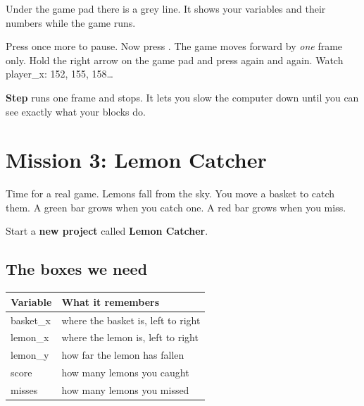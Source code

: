 Under the game pad there is a grey line. It shows your variables and their
numbers while the game runs.

Press  once more to pause. Now press . The game moves
forward by \emph{one} frame only. Hold the right arrow on the game pad and press
 again and again. Watch player\_x: 152, 155, 158\dots

\begin{prgconcept}
\textbf{Step} runs one frame and stops. It lets you slow the computer down
until you can see exactly what your blocks do.
\end{prgconcept}

\section{Mission 3: Lemon Catcher}

Time for a real game. Lemons fall from the sky. You move a basket to catch
them. A green bar grows when you catch one. A red bar grows when you miss.

Start a \textbf{new project} called \textbf{Lemon Catcher}.

\subsection*{The boxes we need}

\begin{center}
\begin{tabular}{@{}ll@{}}
\toprule
Variable & What it remembers \\
\midrule
basket\_x & where the basket is, left to right \\
lemon\_x & where the lemon is, left to right \\
lemon\_y & how far the lemon has fallen \\
score & how many lemons you caught \\
misses & how many lemons you missed \\
\bottomrule
\end{tabular}
\end{center}

\begin{prgmission}
\end{prgmission}

